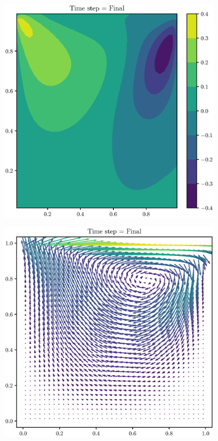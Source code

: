 \documentclass[12pt,a4paper,fleqn]{article}
\begin{document}
\begin{figure}[H]
    \centering
    \includegraphics[width=\textwidth]{n,xy=40_qk_vContours.eps}
    \label{fig:n,xy=40_qk_vContours.eps}
\end{figure}

\begin{figure}[H]
    \centering
    \includegraphics[width=\textwidth]{n,xy=40_qk_velVectors.eps}
    \label{fig:n,xy=40_qk_velVectors.eps}
\end{figure}
\end{document}
